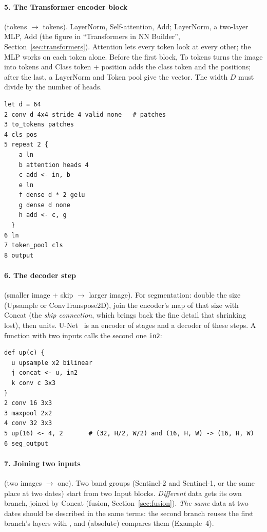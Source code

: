 \paragraph{5. The Transformer encoder block} (tokens $\rightarrow$ tokens). LayerNorm, Self-attention, Add; LayerNorm, a two-layer MLP,
Add (the figure in ``Transformers in NN Builder'', Section~\ref{sec:transformers}). Attention lets every token look at every other; the MLP works on each token alone. Before the
first block, To tokens turns the image into tokens and Class token + position adds the class token and the positions; after the last,
a LayerNorm and Token pool give the vector. The width $D$ must divide by the number of heads.
\begin{verbatim}
let d = 64
2 conv d 4x4 stride 4 valid none   # patches
3 to_tokens patches
4 cls_pos
5 repeat 2 {
    a ln
    b attention heads 4
    c add <- in, b
    e ln
    f dense d * 2 gelu
    g dense d none
    h add <- c, g
  }
6 ln
7 token_pool cls
8 output
\end{verbatim}

\paragraph{6. The decoder step} (smaller image + skip $\rightarrow$ larger image). For segmentation: double the size (Upsample or
ConvTranspose2D), join the encoder's map of that size with Concat (the \emph{skip connection}, which brings back the fine detail that
shrinking lost), then units. U-Net~\cite{ronneberger2015unet} is an encoder of stages and a decoder of these steps. A function with two
inputs calls the second one \texttt{in2}:
\begin{verbatim}
def up(c) {
  u upsample x2 bilinear
  j concat <- u, in2
  k conv c 3x3
}
2 conv 16 3x3
3 maxpool 2x2
4 conv 32 3x3
5 up(16) <- 4, 2       # (32, H/2, W/2) and (16, H, W) -> (16, H, W)
6 seg_output
\end{verbatim}

\paragraph{7. Joining two inputs} (two images $\rightarrow$ one). Two band groups (Sentinel-2 and Sentinel-1, or the same place at two
dates) start from two Input blocks. \emph{Different} data gets its own branch, joined by Concat (fusion, Section~\ref{sec:fusion}).
\emph{The same} data at two dates should be described in the same terms: the second branch reuses the first branch's layers with
, and  (absolute) compares them (Example~4).

